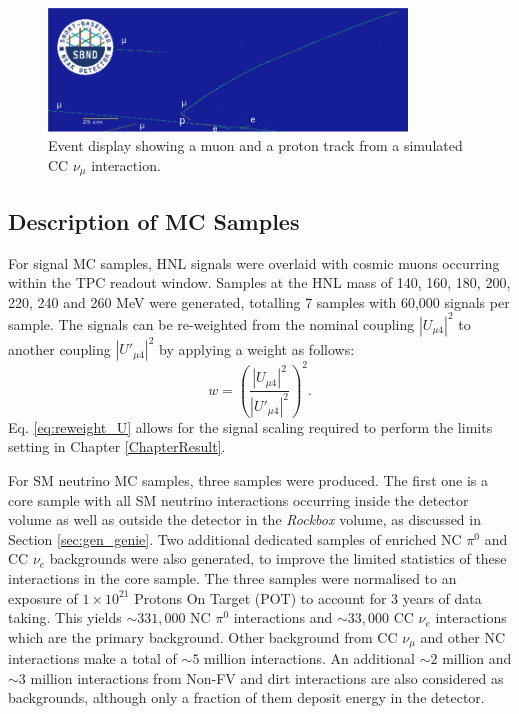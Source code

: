 \begin{figure}[hb!]
	\centering
        \includegraphics[width=0.85\textwidth]{1m1p_cos}
        \caption[Event Display of a Charged Currect Interaction Containing a Muon and a Proton]{
		Event display showing a muon and a proton track from a simulated CC $\nu_\mu$ interaction.
	}
	\label{fig:numu_cos_evd}
\end{figure}


\subsection{Description of MC Samples}
\label{sec:select_mc}


For signal MC samples, HNL signals were overlaid with cosmic muons occurring within the TPC readout window.
Samples at the HNL mass of 140, 160, 180, 200, 220, 240 and 260 MeV were generated, totalling 7 samples with 60,000 signals per sample.
The signals can be re-weighted from the nominal coupling $|U_{\mu4}|^{2}$ to another coupling $|U'_{\mu4}|^{2}$ by applying a weight as follows:
\begin{equation}
    w = \left(\frac{|U_{\mu4}|^{2}}{|U'_{\mu4}|^{2}}\right)^{2}.
    \label{eq:reweight_U}
\end{equation}
Eq. \ref{eq:reweight_U} allows for the signal scaling required to perform the limits setting in Chapter \ref{ChapterResult}.   

For SM neutrino MC samples, three samples were produced.
The first one is a core sample with all SM neutrino interactions occurring inside the detector volume as well as outside the detector in the \textit{Rockbox} volume, as discussed in Section \ref{sec:gen_genie}.
Two additional dedicated samples of enriched NC $\pi^0$ and CC $\nu_e$ backgrounds were also generated, to improve the limited statistics of these interactions in the core sample.
The three samples were normalised to an exposure of $1 \times 10^{21}$ Protons On Target (POT) to account for 3 years of data taking.
This yields $\sim331,000$ NC $\pi^0$ interactions and $\sim33,000$ CC $\nu_e$ interactions which are the primary background.
Other background from CC $\nu_\mu$ and other NC interactions make a total of $\sim5$ million interactions.
An additional $\sim2$ million and $\sim3$ million interactions from Non-FV and dirt interactions are also considered as backgrounds, although only a fraction of them deposit energy in the detector.

